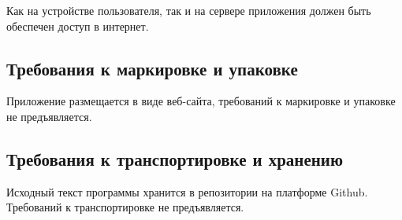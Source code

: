 Как на устройстве пользователя, так и на сервере приложения должен быть обеспечен доступ в интернет.

\subsection{Требования к маркировке и упаковке}

Приложение размещается в виде веб-сайта, требований к маркировке и упаковке не предъявляется.

\subsection{Требования к транспортировке и хранению}

Исходный текст программы хранится в репозитории на платформе Github. Требований к транспортировке не предъявляется.
